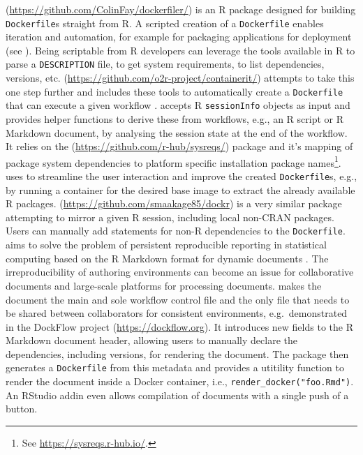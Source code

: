 \textbf{}
(\url{https://github.com/ColinFay/dockerfiler/}) is an R package
designed for building \texttt{Dockerfile}s straight from R. A scripted
creation of a \texttt{Dockerfile} enables iteration and automation, for
example for packaging applications for deployment (see
). Being scriptable from R developers can leverage
the tools available in R to parse a \texttt{DESCRIPTION} file, to get
system requirements, to list dependencies, versions, etc.
\textbf{}
(\url{https://github.com/o2r-project/containerit/}) attempts to take
this one step further and includes these tools to automatically create a
\texttt{Dockerfile} that can execute a given workflow
\citep{nust_containerit_2019}.  accepts R
\texttt{sessionInfo} objects as input and provides helper functions to
derive these from workflows, e.g., an R script or R Markdown document,
by analysing the session state at the end of the workflow. It relies on
the  (\url{https://github.com/r-hub/sysreqs/}) package and
it's mapping of package system dependencies to platform specific
installation package
names\footnote{See \href{https://sysreqs.r-hub.io/}{https://sysreqs.r-hub.io/}.}.
 uses  to streamline the user
interaction and improve the created \texttt{Dockerfile}s, e.g., by
running a container for the desired base image to extract the already
available R packages. \textbf{}
(\url{https://github.com/smaakage85/dockr}) is a very similar package
attempting to mirror a given R session, including local non-CRAN
packages\citep{kjeldgaard_dockr_2019}. Users can manually add statements
for non-R dependencies to the \texttt{Dockerfile}.
\textbf{} aims to solve the problem of persistent
reproducible reporting in statistical computing based on the R Markdown
format \citep{xie2018} for dynamic documents
\citep[\href{https://nanx.me/liftr/}{https://nanx.me/liftr/}, ][]{liftr2019}.
The irreproducibility of authoring environments can become an issue for
collaborative documents and large-scale platforms for processing
documents.  makes the document the main and sole workflow
control file and the only file that needs to be shared between
collaborators for consistent environments, e.g.~demonstrated in the
DockFlow project (\url{https://dockflow.org}). It introduces new fields
to the R Markdown document header, allowing users to manually declare
the dependencies, including versions, for rendering the document. The
package then generates a \texttt{Dockerfile} from this metadata and
provides a utitility function to render the document inside a Docker
container, i.e., \texttt{render\_docker("foo.Rmd")}. An RStudio addin
even allows compilation of documents with a single push of a button.

